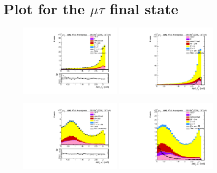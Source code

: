 \newpage

\section*{Plot for the $\mu\tau$ final state}

\begin{figure}[htp]
	\includegraphics[width=0.45\textwidth]{plots/mt/DeltaPhiL1L2_CR.pdf}
	\includegraphics[width=0.45\textwidth]{plots/mt/DeltaPhiL1L2_withsignal.pdf}

	\includegraphics[width=0.45\textwidth]{plots/mt/DeltaPhiL1Z_CR.pdf}
	\includegraphics[width=0.45\textwidth]{plots/mt/DeltaPhiL1Z_withsignal.pdf}

\end{figure}


